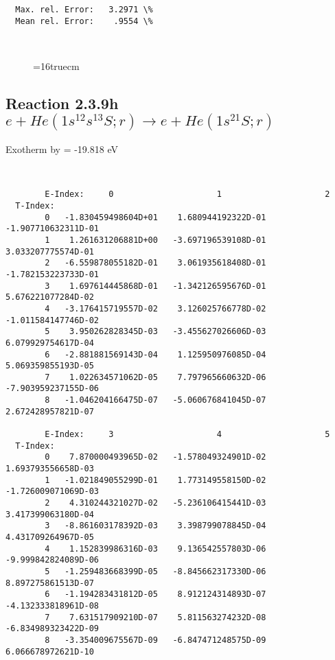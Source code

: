 \documentclass[12pt,dvipdfmx]{article}
\begin{document}
\begin{small}
\begin{verbatim}
  Max. rel. Error:   3.2971 \%
  Mean rel. Error:    .9554 \%



\end{verbatim}\end{small}
\begin{figure} \label{2.3.9g}
\epsfxsize=16truecm
\end{figure}
\newpage

\subsection{
Reaction 2.3.9h  $e + He(1s^12s^13S;r) \rightarrow e + He(1s^21S;r) $
}
Exotherm by =  -19.818 eV

\begin{small}\begin{verbatim}


        E-Index:     0                     1                     2
  T-Index:
        0   -1.830459498604D+01    1.680944192322D-01   -1.907710632311D-01
        1    1.261631206881D+00   -3.697196539108D-01    3.033207775574D-01
        2   -6.559878055182D-01    3.061935618408D-01   -1.782153223733D-01
        3    1.697614445868D-01   -1.342126595676D-01    5.676221077284D-02
        4   -3.176415719557D-02    3.126025766778D-02   -1.011584147746D-02
        5    3.950262828345D-03   -3.455627026606D-03    6.079929754617D-04
        6   -2.881881569143D-04    1.125950976085D-04    5.069359855193D-05
        7    1.022634571062D-05    7.797965660632D-06   -7.903959237155D-06
        8   -1.046204166475D-07   -5.060676841045D-07    2.672428957821D-07

        E-Index:     3                     4                     5
  T-Index:
        0    7.870000493965D-02   -1.578049324901D-02    1.693793556658D-03
        1   -1.021849055299D-01    1.773149558150D-02   -1.726009071069D-03
        2    4.310244321027D-02   -5.236106415441D-03    3.417399063180D-04
        3   -8.861603178392D-03    3.398799078845D-04    4.431709264967D-05
        4    1.152839986316D-03    9.136542557803D-06   -9.999842824089D-06
        5   -1.259483668399D-05   -8.845662317330D-06    8.897275861513D-07
        6   -1.194283431812D-05    8.912124314893D-07   -4.132333818961D-08
        7    7.631517909210D-07    5.811563274232D-08   -6.834989323422D-09
        8   -3.354009675567D-09   -6.847471248575D-09    6.066678972621D-10


\end{verbatim}
\end{small}
\end{document}

